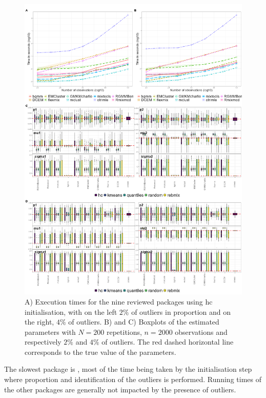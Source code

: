 \begin{figure}

{\centering \includegraphics[width=1\linewidth]{figs/univariate/outliers} 

}

\caption{A) Execution times for the nine reviewed packages using hc initialisation, with on the left $2\%$ of outliers in proportion and on the right, $4\%$ of outliers.  B) and C) Boxplots of the estimated parameters with $N=200$ repetitions, $n=2000$ observations and respectively $2\%$ and $4\%$ of outliers. The red dashed horizontal line corresponds to the true value of the parameters.}\label{fig:outliers}
\end{figure}

The slowest package is , most of the time being taken by
the initialisation step where proportion and identification of the
outliers is performed. Running times of the other packages are generally
not impacted by the presence of outliers.

